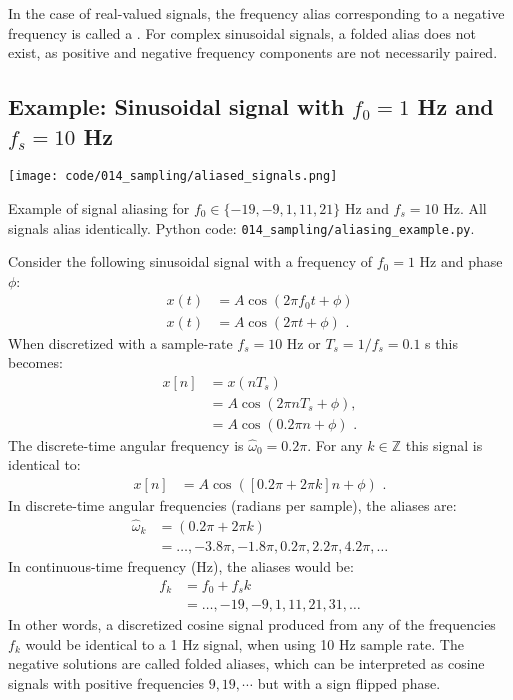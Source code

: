 In the case of real-valued signals, the frequency alias corresponding to a negative 
frequency is called a \emph{}. For complex sinusoidal 
signals, a folded alias does not exist, as positive and negative frequency 
components are not necessarily paired.

\subsection{Example: Sinusoidal signal with $f_0=1$ Hz and $f_s=10$ Hz}
\begin{marginfigure}
  \begin{center}
    \texttt{[image: code/014\_sampling/aliased\_signals.png]}
  \end{center}
  \caption{Example of signal aliasing for $f_0\in \{-19,-9,1,11,21\}$
    Hz and $f_s=10$ Hz. All signals alias identically. Python code:
    \texttt{014\_sampling/aliasing\_example.py}.}
\end{marginfigure}

Consider the following sinusoidal signal with a frequency of $f_0 =1$ Hz and phase $\phi$:
\begin{align}
  x(t) & =A\cos(2\pi f_0 t + \phi)  \\
  x(t) & =A\cos(2\pi t + \phi)\,\,.
\end{align}
When discretized with a sample-rate $f_s=10$ Hz or $T_s=1/f_s = 0.1$ s this becomes:
\begin{align}
  x[n] & =x(nT_s)                     \\
       & =A\cos(2\pi n T_s + \phi),   \\
       & =A\cos(0.2\pi n + \phi)\,\,.
\end{align}
The discrete-time angular frequency is $\hat{\omega}_0 = 0.2\pi$. 
For any $k\in\mathbb{Z}$ this signal is identical to:
\begin{align}
  x[n] & =A\cos([0.2\pi + 2\pi k] n + \phi)\,\,.
\end{align}
In discrete-time angular frequencies (radians per sample), the aliases are:
\begin{align}
  \hat{\omega}_k & = (0.2\pi+2\pi k)                                   \\
                 & =\ldots,-3.8\pi,-1.8\pi,0.2\pi,2.2\pi,4.2\pi,\ldots
\end{align}
In continuous-time frequency (Hz), the aliases would be:
\begin{align}
  f_k & =f_0 + f_s k                     \\
      & =\ldots,-19,-9,1,11,21,31,\ldots
\end{align}
In other words, a discretized cosine signal produced from any of the frequencies $f_k$ 
would be identical to a 1 Hz signal, when using 10 Hz sample rate. The negative solutions 
are called folded aliases, which can be interpreted as cosine signals with positive 
frequencies $9,19,\cdots$ but with a sign flipped phase.

